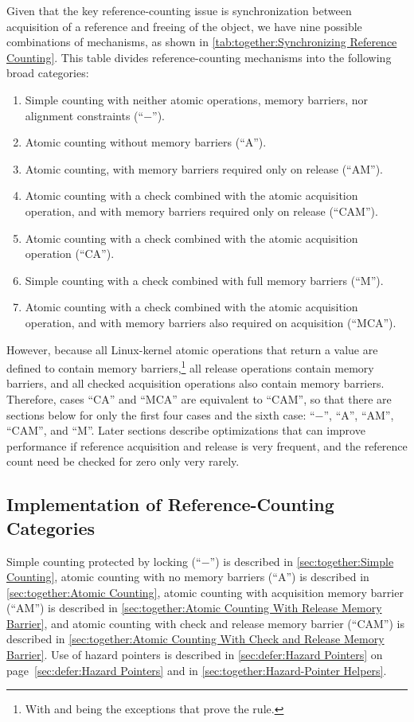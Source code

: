 Given that the key reference-counting issue
is synchronization between acquisition
of a reference and freeing of the object, we have nine possible
combinations of mechanisms, as shown in
\cref{tab:together:Synchronizing Reference Counting}.
This table
divides reference-counting mechanisms into the following broad categories:
\begin{enumerate}
\item	Simple counting with neither atomic operations, memory
	barriers, nor alignment constraints (``$-$'').
\item	Atomic counting without memory barriers (``A'').
\item	Atomic counting, with memory barriers required only on release
	(``AM'').
\item	Atomic counting with a check combined with the atomic acquisition
	operation, and with memory barriers required only on release
	(``CAM'').
\item	Atomic counting with a check combined with the atomic acquisition
	operation (``CA'').
\item	Simple counting with a check combined with full memory barriers
	(``M'').
\item	Atomic counting with a check combined with the atomic acquisition
	operation, and with memory barriers also required on acquisition
	(``MCA'').
\end{enumerate}
However, because all Linux-kernel atomic operations that return a
value are defined to contain memory barriers,\footnote{
	With  and  being the
	exceptions that prove the rule.}
all release operations
contain memory barriers, and all checked acquisition operations also
contain memory barriers.
Therefore, cases ``CA'' and ``MCA'' are equivalent to ``CAM'', so that
there are sections below for only the first four cases and the sixth case:
``$-$'', ``A'', ``AM'', ``CAM'', and ``M''.
Later sections describe optimizations that can improve performance
if reference acquisition and release is very frequent, and the
reference count need be checked for zero only very rarely.

\subsection{Implementation of Reference-Counting Categories}
\label{sec:together:Implementation of Reference-Counting Categories}

Simple counting protected by locking (``$-$'') is described in
\cref{sec:together:Simple Counting},
atomic counting with no memory barriers (``A'') is described in
\cref{sec:together:Atomic Counting},
atomic counting with acquisition memory barrier (``AM'') is described in
\cref{sec:together:Atomic Counting With Release Memory Barrier},
and
atomic counting with check and release memory barrier (``CAM'') is described in
\cref{sec:together:Atomic Counting With Check and Release Memory Barrier}.
Use of hazard pointers is described in
\cref{sec:defer:Hazard Pointers}
on page~\ref{sec:defer:Hazard Pointers}
and in
\cref{sec:together:Hazard-Pointer Helpers}.

